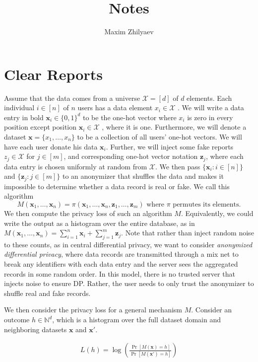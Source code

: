 \documentclass[11pt]{article}
\title{Notes}
\author{Maxim Zhilyaev}
\newcommand{\bbx}{\pmb{x}}
\newcommand{\bbz}{\pmb{z}}
\newcommand{\cX}{\mathcal{X}}
\newcommand{\N}{\mathbb{N}}
\begin{document}
\maketitle

\section{Clear Reports}

Assume that the data comes from a universe $\cX = [d]$ of $d$ elements. Each individual $i \in [n]$ of $n$ users has a data element $x_i\in \cX$ . We will write a data entry in bold $\bbx_i \in \{0, 1\}^d $ to be the one-hot vector where $x_i$ is zero in every position except position $\bbx_i \in \cX$ , where it is one. Furthermore, we will denote a dataset $\bbx = \{x_1,\dots ,x_n\}$ to be a collection of all users' one-hot vectors. We will have each user donate his data $\bbx_i$. Further, we will inject some fake reports $z_j\in \cX$ for $j \in [m]$, and corresponding one-hot vector notation $\bbz_j$, where each data entry is chosen uniformly at random from $\cX$. We then pass $\{\bbx_i : i \in [n]\}$ and $\{\bbz_j : j \in [m]\} $ to an anonymizer that shuffles the data and makes it impossible to determine whether a data record is real or fake. We call this algorithm 
\[
M(\bbx_1,  \dots , \bbx_n) = \pi (\bbx_1, \dots , \bbx_n, \bbz_1, \dots , \bbz_m) \text{ where } \pi \text{ permutes its elements}. 
\]
We then compute the privacy loss of such an algorithm $M$. Equivalently, we could write the output as a histogram over the entire database, as in $M(\bbx_1,  \dots , \bbx_n) = \sum^n_{i=1} \bbx_i + \sum^m_{j=1} \bbz_j$. Note that rather than inject random noise to these counts, as in central differential privacy, we want to consider \emph{anonymized differential privacy}, where data records are transmitted through a mix net to break any identifiers with each data entry and the server sees the aggregated records in some random order. In this model, there is no trusted server that injects noise to ensure DP. Rather, the user needs to only trust the anonymizer to shuffle real and fake records.

We then consider the privacy loss for a general mechanism $M$. Consider an outcome $h \in \N^d$, which is a histogram over the full dataset domain and neighboring datasets $\bbx$ and $\bbx'$.

\begin{align}
L(h) = \log \left ( \frac{\Pr[M(\bbx) = h]}{\Pr[M(\bbx') = h]} \right )
\end{align}
\end{document}
